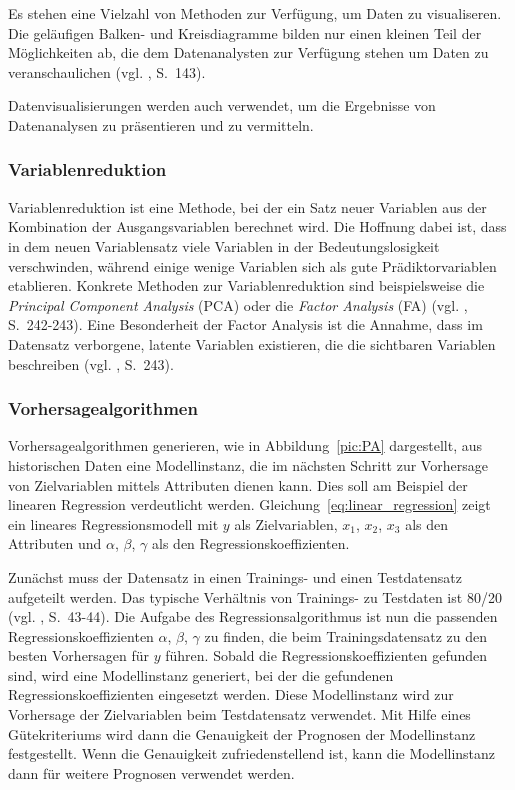 Es stehen eine Vielzahl von Methoden zur Verfügung, um Daten zu visualiseren.
Die geläufigen Balken- und Kreisdiagramme bilden nur einen kleinen Teil der
Möglichkeiten ab, die dem Datenanalysten zur Verfügung stehen um Daten zu
veranschaulichen (vgl. \cite{Dinov}, S.~143). 

Datenvisualisierungen werden auch verwendet, um die Ergebnisse von Datenanalysen
zu präsentieren und zu vermitteln. 

\subsubsection{Variablenreduktion}
Variablenreduktion ist eine Methode, bei der ein Satz neuer Variablen aus der Kombination
der Ausgangsvariablen berechnet wird. Die Hoffnung dabei ist, dass in dem neuen Variablensatz
viele Variablen in der Bedeutungslosigkeit verschwinden, während einige wenige Variablen sich als
gute Prädiktorvariablen etablieren. Konkrete Methoden zur Variablenreduktion sind beispielsweise
die \emph{Principal Component Analysis} (PCA) oder die \emph{Factor Analysis} (FA) (vgl. \cite{Dinov}, S.~242-243). 
Eine Besonderheit der Factor Analysis ist die Annahme, dass im Datensatz verborgene, latente Variablen existieren,
die die sichtbaren Variablen beschreiben (vgl. \cite{Dinov}, S.~243).

\subsubsection{Vorhersagealgorithmen}

Vorhersagealgorithmen generieren, wie in Abbildung~\ref{pic:PA} dargestellt, aus historischen Daten
eine Modellinstanz, die im nächsten Schritt zur Vorhersage von Zielvariablen mittels Attributen dienen kann.
Dies soll am Beispiel der linearen Regression verdeutlicht werden. Gleichung~\ref{eq:linear_regression} zeigt
ein lineares Regressionsmodell mit $y$ als Zielvariablen, $x_1$, $x_2$, $x_3$ als den Attributen und $\alpha$, $\beta$, $\gamma$
als den Regressionskoeffizienten.

Zunächst muss der Datensatz in einen Trainings- und einen Testdatensatz aufgeteilt werden. Das typische Verhältnis von Trainings- zu Testdaten
ist 80/20 (vgl. \cite{McCarthy}, S.~43-44). Die Aufgabe des Regressionsalgorithmus ist nun die passenden Regressionskoeffizienten
$\alpha$, $\beta$, $\gamma$ zu finden, die beim Trainingsdatensatz zu den besten Vorhersagen für $y$ führen. Sobald die Regressionskoeffizienten
gefunden sind, wird eine Modellinstanz generiert, bei der die gefundenen Regressionskoeffizienten eingesetzt werden. Diese Modellinstanz wird
zur Vorhersage der Zielvariablen beim Testdatensatz verwendet. Mit Hilfe eines Gütekriteriums wird dann die Genauigkeit der Prognosen der Modellinstanz festgestellt.
Wenn die Genauigkeit zufriedenstellend ist, kann die Modellinstanz dann für weitere Prognosen verwendet werden.

